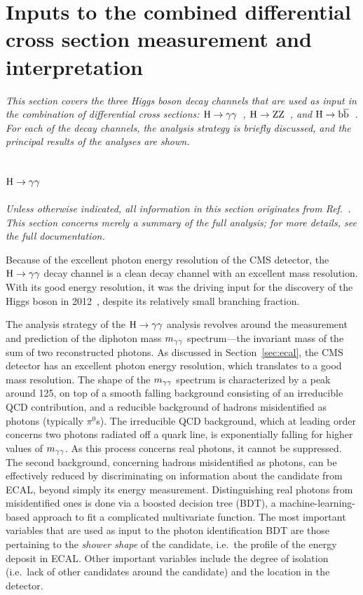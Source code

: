 \section{Inputs to the combined differential cross section measurement and interpretation}
\label{sec:inputs}

\emph{%
This section covers the three Higgs boson decay channels that are used as input in the combination of differential cross sections: $\mathrm{H}\to\mathrm{\gamma}\mathrm{\gamma}$~\cite{Sirunyan:2018kta}, $\mathrm{H}\to\mathrm{Z}\mathrm{Z}$~\cite{Sirunyan:2017exp}, and $\mathrm{H}\to\mathrm{b}\overline{\mathrm{b}}$~\cite{Sirunyan:2017dgc}.
% 
For each of the decay channels, the analysis strategy is briefly discussed, and the principal results of the analyses are shown.
}

\subsection{\texorpdfstring{$\mathrm{H}\to\mathrm{\gamma}\mathrm{\gamma}$}{H to gamma gamma}}

\emph{%
Unless otherwise indicated, all information in this section originates from Ref.~\cite{Sirunyan:2018kta}. This section concerns merely a summary of the full analysis; for more details, see the full documentation.
}

Because of the excellent photon energy resolution of the CMS detector, the $\mathrm{H}\to\mathrm{\gamma}\mathrm{\gamma}$ decay channel is a clean decay channel with an excellent mass resolution.
% 
With its good energy resolution, it was the driving input for the discovery of the Higgs boson in 2012~\cite{Aad:2012tfa,Chatrchyan:2012xdj,Chatrchyan:2013lba}, despite its relatively small branching fraction.


The analysis strategy of the $\mathrm{H}\to\mathrm{\gamma}\mathrm{\gamma}$ analysis revolves around the measurement and prediction of the diphoton mass $m_{\mathrm{\gamma}\mathrm{\gamma}}$ spectrum---the invariant mass of the sum of two reconstructed photons.
% 
As discussed in Section~\ref{sec:ecal}, the CMS detector has an excellent photon energy resolution, which translates to a good mass resolution.
% 
The shape of the $m_{\mathrm{\gamma}\mathrm{\gamma}}$ spectrum is characterized by a peak around 125\GeV, on top of a smooth falling background consisting of an irreducible QCD contribution, and a reducible background of hadrons misidentified as photons (typically $\pi^0$s).
% 
The irreducible QCD background, which at leading order concerns two photons radiated off a quark line, is exponentially falling for higher values of $m_{\mathrm{\gamma}\mathrm{\gamma}}$.
% 
As this process concerns real photons, it cannot be suppressed.
% 
The second background, concerning hadrons misidentified as photons, can be effectively reduced by discriminating on information about the candidate from ECAL, beyond simply its energy measurement.
% 
Distinguishing real photons from misidentified ones is done via a boosted decision tree (BDT), a machine-learning-based approach to fit a complicated multivariate function.
% 
The most important variables that are used as input to the photon identification BDT are those pertaining to the \textit{shower shape} of the candidate, i.e.\ the profile of the energy deposit in ECAL.
% 
Other important variables include the degree of isolation (i.e.\ lack of other candidates around the candidate) and the location in the detector.


